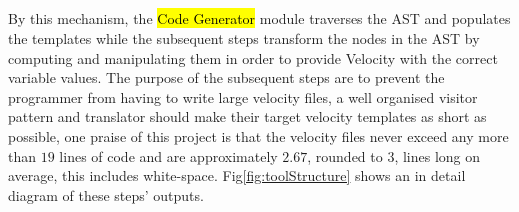	\hspace*{\fill}\\
	\hspace*{\fill}\\
	\hspace*{\fill}\\
	\hspace*{\fill}\\
	\mbox{}
	\hfill\break
	\rmfamily
	By this mechanism, the \ttfamily\ttfamily\hl{Code Generator} \rmfamily \rmfamily module traverses the AST and populates the templates while the subsequent steps transform the nodes in the AST by computing and manipulating them in order to provide Velocity with the correct variable values. The purpose of the subsequent steps are to prevent the programmer from having to write large velocity files, a well organised visitor pattern and translator should make their target velocity templates as short as possible, one praise of this project is that the velocity files never exceed any more than $19$ lines of code and are approximately $2.67$, rounded to $3$, lines long on average, this includes white-space. Fig\ref{fig:toolStructure} shows an in detail diagram of these steps' outputs.

